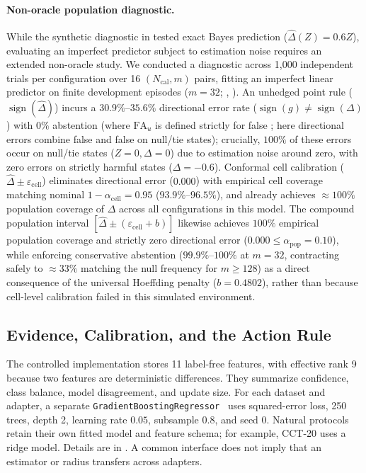 \paragraph{Non-oracle population diagnostic.}
While the synthetic diagnostic in  tested exact Bayes prediction ($\widehat\Delta(Z) = 0.6Z$), evaluating an imperfect predictor subject to estimation noise requires an extended non-oracle study. We conducted a diagnostic across 1,000 independent trials per configuration over 16 $(N_{\mathrm{cal}}, m)$ pairs, fitting an imperfect linear predictor on finite development episodes ($m=32$; , ).
An unhedged point rule ($\operatorname{sign}(\widehat\Delta)$) incurs a $30.9\%$--$35.6\%$ directional error rate ($\operatorname{sign}(g) \neq \operatorname{sign}(\Delta)$) with $0\%$ abstention (where $\mathrm{FA}_u$ is defined strictly for false \adapt; here directional errors combine false \adapt and false \freeze on null/tie states); crucially, $100\%$ of these errors occur on null/tie states ($Z=0, \Delta=0$) due to estimation noise around zero, with zero errors on strictly harmful states ($\Delta = -0.6$). Conformal cell calibration ($\widehat\Delta \pm \varepsilon_{\mathrm{cell}}$) eliminates directional error ($0.000$) with empirical cell coverage matching nominal $1-\alpha_{\mathrm{cell}}=0.95$ ($93.9\%$--$96.5\%$), and already achieves $\approx 100\%$ population coverage of $\Delta$ across all configurations in this model. The compound population interval $[\widehat\Delta \pm (\varepsilon_{\mathrm{cell}} + b)]$ likewise achieves $100\%$ empirical population coverage and strictly zero directional error ($0.000 \le \alpha_{\mathrm{pop}}=0.10$), while enforcing conservative abstention ($99.9\%$--$100\%$ at $m=32$, contracting safely to $\approx 33\%$ matching the null frequency for $m \ge 128$) as a direct consequence of the universal Hoeffding penalty ($b=0.4802$), rather than because cell-level calibration failed in this simulated environment.


\subsection{Evidence, Calibration, and the Action Rule}

The controlled implementation stores 11 label-free features, with effective rank 9 because two
features are deterministic differences. They summarize confidence, class balance, model
disagreement, and update size. For each dataset and adapter, a separate
\texttt{GradientBoostingRegressor}~\cite{pedregosa2011sklearn} uses squared-error loss, 250 trees,
depth 2, learning rate $0.05$, subsample $0.8$, and seed 0.
Natural protocols retain their own fitted model and feature schema; for example, CCT-20 uses a
ridge model. Details are in . A common interface does not imply
that an estimator or radius transfers across adapters.

